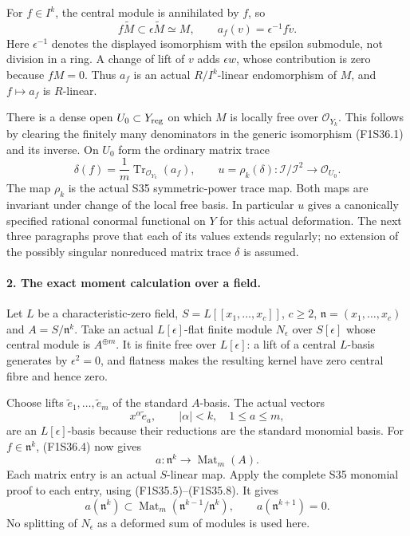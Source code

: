 For $f\in I^k$, the central module is annihilated
by $f$, so
\[
 f\widetilde M\subset\epsilon\widetilde M
       \simeq M,\qquad
 a_f(v)=\epsilon^{-1}f\widetilde v.
 \tag{F1S36.4}
\]
Here $\epsilon^{-1}$ denotes the displayed
isomorphism with the epsilon submodule, not
division in a ring. A change of lift of $v$
adds $\epsilon w$, whose contribution is zero
because $fM=0$. Thus $a_f$ is an actual
$R/I^k$-linear endomorphism of $M$, and
$f\mapsto a_f$ is $R$-linear.

There is a dense open $U_0\subset Y_{\rm reg}$
on which $M$ is locally free over
$\mathcal O_{Y_k}$. This follows by clearing
the finitely many denominators in the generic
isomorphism (F1S36.1) and its inverse.
On $U_0$ form the ordinary matrix trace
\[
 \delta(f)=\frac1m\operatorname{Tr}_{\mathcal O_{Y_k}}(a_f),
 \qquad
 u=\rho_k(\delta):\mathcal I/\mathcal I^2
                         \longrightarrow\mathcal O_{U_0}.
 \tag{F1S36.5}
\]
The map $\rho_k$ is the actual S35 symmetric-power
trace map. Both maps are invariant under change
of the local free basis. In particular $u$ gives
a canonically specified rational conormal
functional on $Y$ for this actual deformation.
The next three paragraphs prove that each of
its values extends regularly; no extension of
the possibly singular nonreduced matrix trace
$\delta$ is assumed.

\paragraph{2. The exact moment calculation over a field.}
Let $L$ be a characteristic-zero field,
$S=L[[x_1,\ldots,x_c]]$, $c\ge2$,
$\mathfrak n=(x_1,\ldots,x_c)$ and
$A=S/\mathfrak n^k$.
Take an actual $L[\epsilon]$-flat finite module
$N_\epsilon$ over $S[\epsilon]$ whose central
module is $A^{\oplus m}$.
It is finite free over $L[\epsilon]$: a lift
of a central $L$-basis generates by
$\epsilon^2=0$, and flatness makes the resulting
kernel have zero central fibre and hence zero.

Choose lifts $\widetilde e_1,\ldots,\widetilde e_m$
of the standard $A$-basis. The actual vectors
\[
           x^\alpha\widetilde e_a,
   \qquad |\alpha|<k,\quad 1\le a\le m,
 \tag{F1S36.6}
\]
are an $L[\epsilon]$-basis because their reductions
are the standard monomial basis.
For $f\in\mathfrak n^k$, (F1S36.4) now gives
\[
 a:\mathfrak n^k\longrightarrow
                         \operatorname{Mat}_m(A).
 \tag{F1S36.7}
\]
Each matrix entry is an actual $S$-linear map.
Apply the complete S35 monomial proof
to each entry, using (F1S35.5)--(F1S35.8). It gives
\[
 a(\mathfrak n^k)\subset
       \operatorname{Mat}_m(\mathfrak n^{k-1}/\mathfrak n^k),
 \qquad a(\mathfrak n^{k+1})=0.
 \tag{F1S36.8}
\]
No splitting of $N_\epsilon$ as a deformed
sum of modules is used here.

